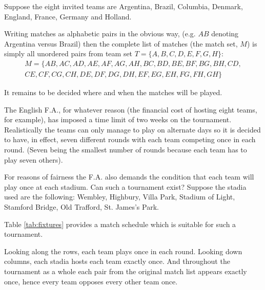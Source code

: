 \begin{example}
Suppose the eight invited teams are Argentina, Brazil, Columbia, Denmark, England, France, Germany and Holland.

Writing matches as alphabetic pairs in the obvious way, (e.g. $AB$ denoting Argentina versus Brazil) then the complete list of matches (the match set, $M$) is simply all unordered pairs from team set $T = \{A, B, C, D, E, F, G, H\}$:
\begin{equation*}
  \begin{split}
    M = \{
      AB, AC, AD, AE, AF, AG, AH, BC, BD, BE, BF, BG, BH, CD, \\
      CE, CF, CG, CH, DE, DF, DG, DH, EF, EG, EH, FG, FH, GH
    \}
  \end{split}
\end{equation*}

It remains to be decided where and when the matches will be played.

The English F.A., for whatever reason (the financial cost of hosting eight teams, for example), has imposed a time limit of two weeks on the tournament.
Realistically the teams can only manage to play on alternate days so it is decided to have, in effect, seven different rounds with each team competing once in each round.
(Seven being the smallest number of rounds because each team has to play seven others).

For reasons of fairness the F.A. also demands the condition that each team will play once at each stadium.
Can such a tournament exist?
Suppose the stadia used are the following: Wembley, Highbury, Villa Park, Stadium of Light, Stamford Bridge, Old Trafford, St. James's Park.

Table \ref{tab:fixtures} provides a match schedule which is suitable for such a tournament.

Looking along the rows, each team plays once in each round.
Looking down columns, each stadia hosts each team exactly once.
And throughout the tournament as a whole each pair from the original match list appears exactly once, hence every team opposes every other team once.
\label{eg:football}
\end{example}

